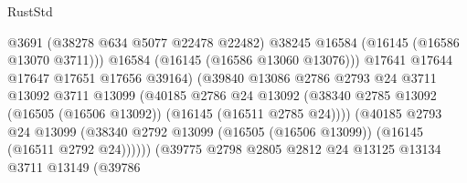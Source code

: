 \begin{lexlean}{RustStd}
\begin{coremodule}
                                              @3691
                                              (@38278 @634 @5077 @22478 @22482)
                                              @38245
                                              @16584
                                              (@16145 (@16586 @13070 @3711)))
                                            @16584
                                            (@16145 (@16586 @13060 @13076)))
                                          @17641
                                          @17644
                                          @17647
                                          @17651
                                          @17656
                                          @39164)
                                        (@39840
                                          @13086
                                          @2786
                                          @2793
                                          @24
                                          @3711
                                          @13092
                                          @3711
                                          @13099
                                          (@40185
                                            @2786
                                            @24
                                            @13092
                                            (@38340
                                              @2785
                                              @13092
                                              (@16505 (@16506 @13092))
                                              (@16145 (@16511 @2785 @24))))
                                          (@40185
                                            @2793
                                            @24
                                            @13099
                                            (@38340
                                              @2792
                                              @13099
                                              (@16505 (@16506 @13099))
                                              (@16145 (@16511 @2792 @24))))))
                                      (@39775
                                        @2798
                                        @2805
                                        @2812
                                        @24
                                        @13125
                                        @13134
                                        @3711
                                        @13149
                                        (@39786

\end{coremodule}
\end{lexlean}
